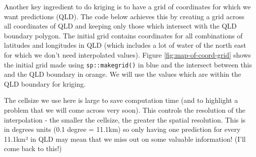 \documentclass[
]{book}
\begin{document}
Another key ingredient to do kriging is to have a grid of coordinates for which we want predictions (QLD).
The code below achieves this by creating a grid across all coordinates of QLD and keeping only those which intersect with the QLD boundary polygon. The initial grid contains coordinates for all combinations of latitudes and longitudes in QLD (which includes a lot of water of the north east for which we don't need interpolated values). Figure \ref{fig:map-of-coord-grid} shows the initial grid made using \texttt{sp::makegrid()} in blue and the intersect between this and the QLD boundary in orange. We will use the values which are within the QLD boundary for kriging.

The cellsize we use here is large to save computation time (and to highlight a problem that we will come across very soon). This controls the resolution of the interpolation - the smaller the cellsize, the greater the spatial resolution. This is in degrees units (0.1 degree = 11.1km) so only having one prediction for every 11.1km² in QLD may mean that we miss out on some valuable information! (I'll come back to this!)
\end{document}
